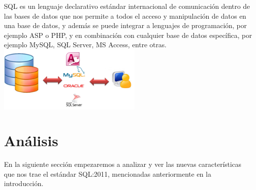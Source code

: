 \documentclass[twoside,twocolumn]{article}
\begin{document}
SQL es un lenguaje declarativo estándar internacional de comunicación dentro de las bases de datos que nos permite a todos el acceso y manipulación de datos en una base de datos, y además se puede integrar a lenguajes de programación, por ejemplo ASP o PHP, y en combinación con cualquier base de datos específica, por ejemplo MySQL, SQL Server, MS Access, entre otras.
\includegraphics[width=7cm]{./Imagenes/basedatossql} 


\section{Análisis}
En la siguiente sección empezaremos a analizar y ver las nuevas características que nos trae el estándar SQL:2011, mencionadas anteriormente en la introducción.
\end{document}
